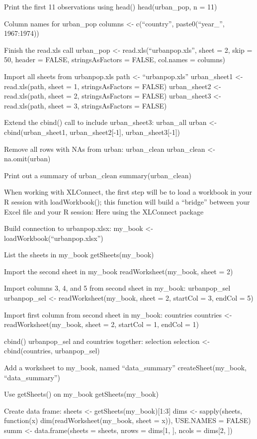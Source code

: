 \documentclass[]{book}
\begin{document}
Print the first 11 observations using head()
head(urban\_pop, n = 11)

Column names for urban\_pop
columns \textless{}- c(``country'', paste0(``year\_'', 1967:1974))

Finish the read.xls call
urban\_pop \textless{}- read.xls(``urbanpop.xls'', sheet = 2,
skip = 50, header = FALSE, stringsAsFactors = FALSE,
col.names = columns)

Import all sheets from urbanpop.xls
path \textless{}- ``urbanpop.xls''
urban\_sheet1 \textless{}- read.xls(path, sheet = 1, stringsAsFactors = FALSE)
urban\_sheet2 \textless{}- read.xls(path, sheet = 2, stringsAsFactors = FALSE)
urban\_sheet3 \textless{}- read.xls(path, sheet = 3, stringsAsFactors = FALSE)

Extend the cbind() call to include urban\_sheet3: urban\_all
urban \textless{}- cbind(urban\_sheet1, urban\_sheet2{[}-1{]}, urban\_sheet3{[}-1{]})

Remove all rows with NAs from urban: urban\_clean
urban\_clean \textless{}- na.omit(urban)

Print out a summary of urban\_clean
summary(urban\_clean)

When working with XLConnect, the first step will be to load a workbook in your R session with loadWorkbook(); this function will build a ``bridge'' between your Excel file and your R session:
Here using the XLConnect package

Build connection to urbanpop.xlsx:
my\_book \textless{}- loadWorkbook(``urbanpop.xlsx'')

List the sheets in my\_book
getSheets(my\_book)

Import the second sheet in my\_book
readWorksheet(my\_book, sheet = 2)

Import columns 3, 4, and 5 from second sheet in my\_book: urbanpop\_sel
urbanpop\_sel \textless{}- readWorksheet(my\_book, sheet = 2, startCol = 3, endCol = 5)

Import first column from second sheet in my\_book: countries
countries \textless{}- readWorksheet(my\_book, sheet = 2, startCol = 1, endCol = 1)

cbind() urbanpop\_sel and countries together: selection
selection \textless{}- cbind(countries, urbanpop\_sel)

Add a worksheet to my\_book, named ``data\_summary''
createSheet(my\_book, ``data\_summary'')

Use getSheets() on my\_book
getSheets(my\_book)

Create data frame:
sheets \textless{}- getSheets(my\_book){[}1:3{]}
dims \textless{}- sapply(sheets, function(x) dim(readWorksheet(my\_book, sheet = x)), USE.NAMES = FALSE)
summ \textless{}- data.frame(sheets = sheets,
nrows = dims{[}1, {]},
ncols = dims{[}2, {]})
\end{document}
